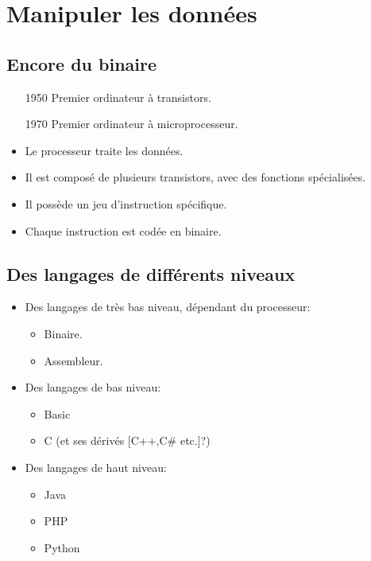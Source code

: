 \section[Manipuler]{Manipuler les données}
\subsection{Encore du binaire}

\begin{slide}
	\begin{itemize}
		\item[1950] Premier ordinateur à transistors.
		\item[1970] Premier ordinateur à microprocesseur. %
	\end{itemize}
\end{slide}

\begin{slide}
	\begin{itemize}
		\item Le processeur traite les données.
		\item Il est composé de plusieurs transistors, avec des fonctions spécialisées.
		\item Il possède un jeu d'instruction spécifique.
		\item Chaque instruction est codée en binaire.
	\end{itemize}
\end{slide}

\subsection{Des langages de différents niveaux}

\begin{slide}
	\begin{itemize}
		\item Des langages de très bas niveau, dépendant du processeur:
		\begin{itemize}
			\item Binaire.
			\item Assembleur.
		\end{itemize}
		\item Des langages de bas niveau:
		\begin{itemize}
			\item Basic
			\item C (et ses dérivés [C++,C\# etc.]?)
		\end{itemize}
		\item Des langages de haut niveau:
		\begin{itemize}
			\item Java
			\item PHP
			\item Python
		\end{itemize}
	\end{itemize}
\end{slide}

